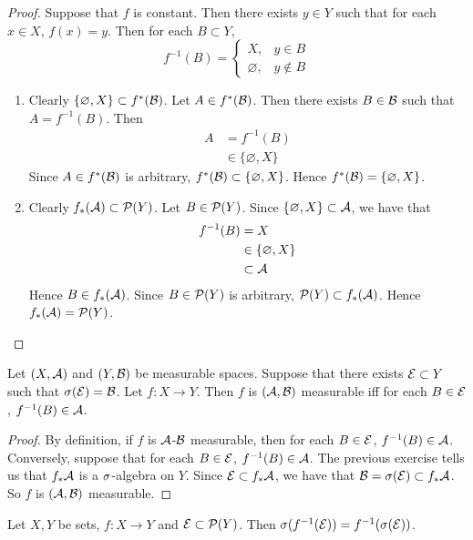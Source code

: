 \documentclass{book}
\begin{document}
	\begin{proof} Suppose that $f$ is constant. Then there exists $y \in Y$ such that for each $x \in X$, $f(x) = y$. Then for each $B \subset Y$, $$f^{-1}(B) = 
		\begin{cases}
			X, & y \in B \\
			\varnothing, & y \not \in B
		\end{cases}
		$$
		\begin{enumerate}
			\item Clearly $\{\varnothing, X\} \subset f^*(\mathcal{B})$. Let $A \in f^{*}(\mathcal{B})$. Then there exists $B \in \mathcal{B}$ such that $A = f^{-1}(B)$. Then 
			\begin{align*}
				A
				& = f^{-1}(B) \\
				& \in \{\varnothing, X\}
			\end{align*}
			Since $A \in f^*(\mathcal{B})$ is arbitrary, $f^*(\mathcal{B}) \subset \{\varnothing, X\}$. Hence $f^*(\mathcal{B}) = \{\varnothing, X\}$.
			\item Clearly $f_*(\mathcal{A}) \subset \mathcal{P}(Y)$. Let $B \in \mathcal{P}(Y)$. Since $\{\varnothing, X\} \subset \mathcal{A}$, we have that 
			\begin{align*}
				f^{-1}(B) 
				& = X \\
				& \in \{\varnothing, X\} \\
				& \subset \mathcal{A}
			\end{align*}
			Hence $B \in f_*(\mathcal{A})$. Since $B \in \mathcal{P}(Y)$ is arbitrary, $\mathcal{P}(Y) \subset f_*(\mathcal{A})$. Hence $f_*(\mathcal{A}) = \mathcal{P}(Y)$.
		\end{enumerate}
	\end{proof}
	
	\begin{ex} 
		Let $(X,\mathcal{A})$ and $(Y, \mathcal{B})$ be measurable spaces. Suppose that there exists $\mathcal{E} \subset Y$ such that $\sigma(\mathcal{E}) = \mathcal{B}$. Let $f:X \rightarrow Y$. Then $f$ is $(\mathcal{A},\mathcal{B})$ measurable iff for each $B \in \mathcal{E}$, $f^{-1}(B) \in \mathcal{A}$.
	\end{ex}
	
	\begin{proof}
		By definition, if $f$ is $\mathcal{A}$-$\mathcal{B}$ measurable, then for each $B \in \mathcal{E}$, $f^{-1}(B) \in \mathcal{A}$. Conversely, suppose that for each $B \in \mathcal{E}$, $f^{-1}(B) \in \mathcal{A}$. The previous exercise tells us that $f_*\mathcal{A}$ is a $\sigma$-algebra on $Y$. Since $\mathcal{E} \subset f_*\mathcal{A}$, we have that $\mathcal{B} = \sigma(\mathcal{E}) \subset f_*\mathcal{A}$. So $f$ is $(\mathcal{A},\mathcal{B})$ measurable.
	\end{proof}
	
	\begin{ex} 
		Let $X,Y$ be sets, $f:X \rightarrow Y$ and $\mathcal{E} \subset \mathcal{P}(Y)$. Then $\sigma(f^{-1}(\mathcal{E})) = f^{-1}(\sigma(\mathcal{E}))$. 
	\end{ex}
	
\end{document}
